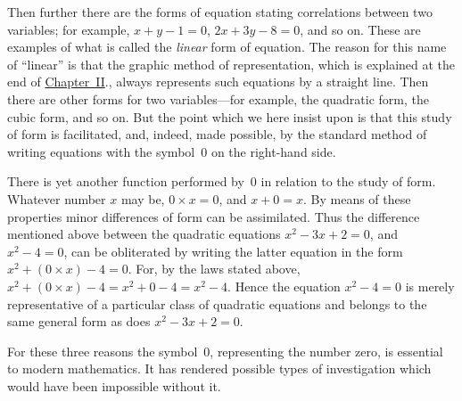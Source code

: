 \documentclass[12pt,leqno]{book}[2005/09/16]
\newcommand{\Typo}[2]{#2}
\newcommand{\Chg}[2]{#2}
\newcommand{\Add}[1]{\Chg{}{#1}}
\newcommand{\ChapRef}[2][Chapter]{\hyperref[chapter:#2]{\Chg{#1}{Chapter}~#2}}
\newcommand{\PageSep}[1]{\ignorespaces}
\begin{document}
Then further there are the forms of equation
stating correlations between two variables;
for example, $x + y - 1 = 0$, $2x + 3y - 8 = 0$, and
so on. These are examples of what is called
the \emph{linear} form of equation. The reason for
this name of ``linear'' is that the graphic
method of representation, which is explained
at the end of \ChapRef{II}\Add{.}, always represents
such equations by a straight line. Then there
are other forms for two variables---for example,
the quadratic form, the cubic form, and so on.
But the point which we here insist upon is
that this study of form is facilitated, and,
indeed, made possible, by the standard method
of writing equations with the symbol~$0$ on
the right-hand side.

There is yet another function performed by~$0$
in relation to the study of form. Whatever
number $x$ may be, $0 × x = 0$, and $x + 0 = x$.
By means of these properties minor differences
of form can be assimilated. Thus the
difference mentioned above between the quadratic
equations $x^{2} - 3x + 2 = 0$, and $x^{2} - 4 = 0$,
can be obliterated by writing the latter
\PageSep{68}
equation in the form $x^{2} + (0 × x) - 4 = 0$. For,
by the laws stated above, $x^{2} + (0 × x) - 4 =
x^{2} + 0 - 4 = x^{2} - 4$. Hence the equation $x^{2} - 4 = 0$\Typo{,}{}
is merely representative of a particular
class of quadratic equations and belongs to
the same general form as does $x^{2} - 3x + 2 = 0$.

For these three reasons the symbol~$0$, representing
the number zero, is essential to
modern mathematics. It has rendered possible
types of investigation which would have
been impossible without it.
\end{document}
